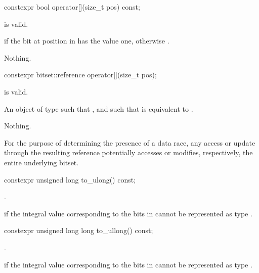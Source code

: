 %
\begin{itemdecl}
constexpr bool operator[](size_t pos) const;
\end{itemdecl}

\begin{itemdescr}
\pnum
\expects
{} is valid.

\pnum
\returns
{} if the bit at position  in  has the value
one, otherwise .

\pnum
\throws
Nothing.
\end{itemdescr}

%
\begin{itemdecl}
constexpr bitset::reference operator[](size_t pos);
\end{itemdecl}

\begin{itemdescr}
\pnum
\expects
{} is valid.

\pnum
\returns
An object of type
such that
,
and such that
is equivalent to
.

\pnum
\throws
Nothing.

\pnum
\remarks
For the purpose of determining the presence of a data
race, any access or update through the resulting
reference potentially accesses or modifies, respectively, the entire
underlying bitset.
\end{itemdescr}

%
\begin{itemdecl}
constexpr unsigned long to_ulong() const;
\end{itemdecl}

\begin{itemdescr}
\pnum
\returns
{}.

\pnum
\throws
{}%
 if the integral value 
corresponding to the bits in 
cannot be represented as type .
\end{itemdescr}

%
\begin{itemdecl}
constexpr unsigned long long to_ullong() const;
\end{itemdecl}

\begin{itemdescr}
\pnum
\returns
{}.

\pnum
\throws
{}%
 if the integral value 
corresponding to the bits in 
cannot be represented as type .
\end{itemdescr}

